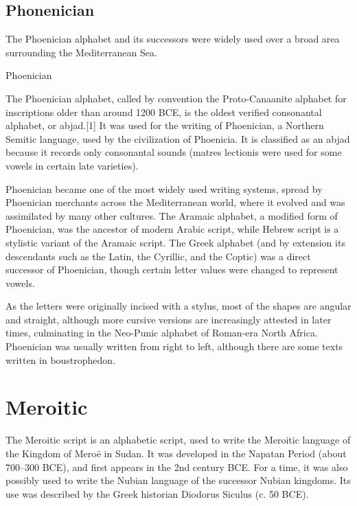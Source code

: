 




\subsection{Phonenician}

The Phoenician alphabet and its successors were widely used over a broad area surrounding the Mediterranean Sea.

\let\phoenician\lycian

\begin{scriptexample}[]{Phoenician}



\end{scriptexample}

The Phoenician alphabet, called by convention the Proto-Canaanite alphabet for inscriptions older than around 1200 BCE, is the oldest verified consonantal alphabet, or abjad.[1] It was used for the writing of Phoenician, a Northern Semitic language, used by the civilization of Phoenicia. It is classified as an abjad because it records only consonantal sounds (matres lectionis were used for some vowels in certain late varieties).

Phoenician became one of the most widely used writing systems, spread by Phoenician merchants across the Mediterranean world, where it evolved and was assimilated by many other cultures. The Aramaic alphabet, a modified form of Phoenician, was the ancestor of modern Arabic script, while Hebrew script is a stylistic variant of the Aramaic script. The Greek alphabet (and by extension its descendants such as the Latin, the Cyrillic, and the Coptic) was a direct successor of Phoenician, though certain letter values were changed to represent vowels.

As the letters were originally incised with a stylus, most of the shapes are angular and straight, although more cursive versions are increasingly attested in later times, culminating in the Neo-Punic alphabet of Roman-era North Africa. Phoenician was usually written from right to left, although there are some texts written in boustrophedon.

\section{Meroitic}

The Meroitic script is an alphabetic script, used to write the Meroitic language of the Kingdom of Meroë in Sudan. It was developed in the Napatan Period (about 700–300 BCE), and first appears in the 2nd century BCE. For a time, it was also possibly used to write the Nubian language of the successor Nubian kingdoms. Its use was described by the Greek historian Diodorus Siculus (c. 50 BCE).

